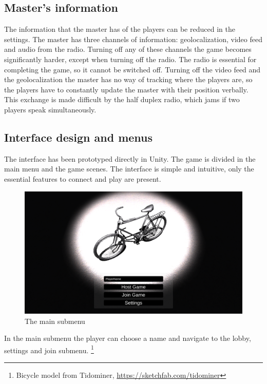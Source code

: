 \documentclass[12pt]{article}
\begin{document}
\subsection{Master's information}
The information that the master has of the players can be reduced in the settings. The master has three channels of information: geolocalization, video feed and audio from the radio. Turning off any of these channels the game becomes significantly harder, except when turning off the radio. The radio is essential for completing the game, so it cannot be switched off. Turning off the video feed and the geolocalization the master has no way of tracking where the players are, so the players have to constantly update the master with their position verbally. This exchange is made difficult by the half duplex radio, which jams if two players speak simultaneously.

\clearpage

\subsection{Interface design and menus}
The interface has been prototyped directly in Unity. The game is divided in the main menu and the game scenes. The interface is simple and intuitive, only the essential features to connect and play are present. 
\begin{figure}[H]
\includegraphics[width=\textwidth]{splash}
\caption{The main submenu}
\end{figure}
In the main submenu the player can choose a name and navigate to the lobby, settings and join submenu. \footnote{Bicycle model from Tidominer, \url{https://sketchfab.com/tidominer}}
\end{document}
